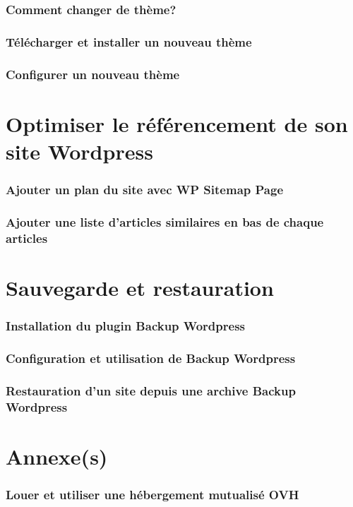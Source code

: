 \documentclass[10pt,a4paper]{article}
\begin{document}
\section{Comment changer de thème?}
\newpage
\section{Télécharger et installer un nouveau thème}
\newpage
\section{Configurer un nouveau thème}

\part{Optimiser le référencement de son site Wordpress}
\newpage
\section{Ajouter un plan du site avec WP Sitemap Page}
\newpage
\section{Ajouter une liste d'articles similaires en bas de chaque articles}
\newpage

\part{Sauvegarde et restauration}
\newpage
\section{Installation du plugin Backup Wordpress}
\newpage
\section{Configuration et utilisation de Backup Wordpress}
\newpage
\section{Restauration d'un site depuis une archive Backup Wordpress}

\part*{Annexe(s)}
\newpage

\section{Louer et utiliser une hébergement mutualisé OVH}
\newpage
\end{document}
